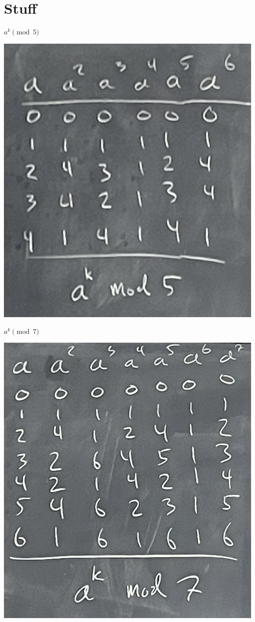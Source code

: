 \section{Stuff}
    $a^k\pmod{5}$  \\
    \begin{center}\includegraphics[scale=0.1]{Images/image1.jpg}\end{center}
    $a^k\pmod{7}$ \\
    \begin{center}\includegraphics[scale=0.08]{Images/image2.jpg}\end{center}

